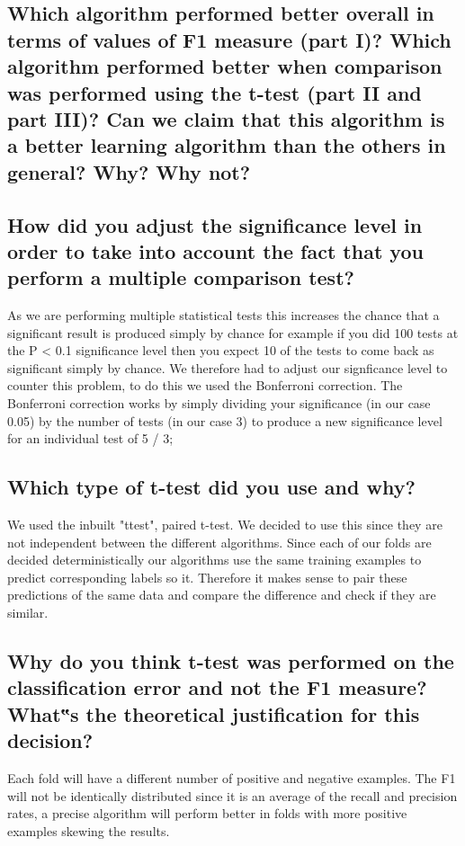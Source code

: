 \documentclass[11pt]{article}
\begin{document}
\subsection{Which algorithm performed better overall in terms of values of F1 measure (part I)? Which algorithm performed better when comparison was performed using the t-test (part II and part III)? Can we claim that this algorithm is a better learning algorithm than the others in general? Why? Why not?}

\subsection{How did you adjust the significance level in order to take into account the fact that you perform a multiple comparison test?}
As we are performing multiple statistical tests this increases the chance that a significant result is produced simply by chance for example if you did 100 tests at the P < 0.1 significance level then you expect 10 of the 
tests to come back as significant simply by chance. We therefore had to adjust our signficance level to counter this problem, to do this we used the Bonferroni correction. The Bonferroni correction works by simply dividing
your significance (in our case 0.05) by the number of tests (in our case 3) to produce a new significance level for an individual test of 5 / 3; 

\subsection{Which type of t-test did you use and why?}

We used the inbuilt "ttest", paired t-test. We decided to use this since they are not independent between the different algorithms. Since each of our folds are decided deterministically our algorithms use the same training examples to predict corresponding labels so it. Therefore it makes sense to pair these predictions of the same data and compare the difference and check if they are similar.  

\subsection{Why do you think t-test was performed on the classification error and not the F1 measure? What‟s the theoretical justification for this decision?}

Each fold will have a different number of positive and negative examples. The F1 will not be identically distributed since it is an average of the recall and precision rates, a precise algorithm will perform better in folds with more positive examples skewing the results. 
\end{document}

